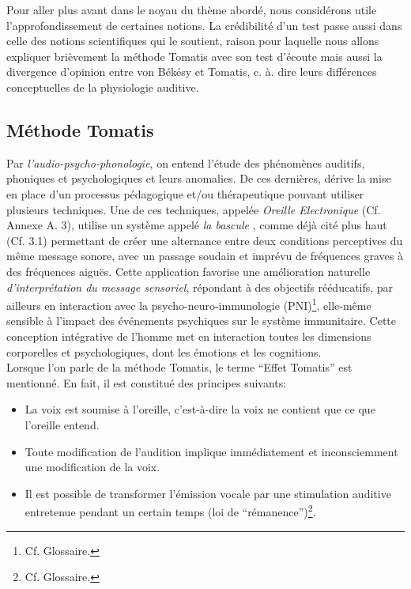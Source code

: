 

Pour aller plus avant dans le noyau du thème abordé, nous considérons utile
l'approfondissement de certaines notions. La crédibilité d'un test passe aussi dans celle des 
notions scientifiques qui le soutient, raison pour laquelle nous allons expliquer brièvement  la 
méthode Tomatis avec son test d'écoute mais aussi la
divergence d'opinion entre von Békésy et Tomatis, c. à. dire leurs différences conceptuelles de la 
physiologie auditive. 
\subsection{Méthode Tomatis}
Par {\textit{l'audio-psycho-phonologie}}, on entend l'étude des
phénomènes auditifs, phoniques et psychologiques et leurs anomalies.
De ces dernières,  dérive la mise en place d'un processus pédagogique
et/ou thérapeutique pouvant
utiliser plusieurs techniques.
Une de ces techniques,
  appelée
\label{outil_oreille_electro}
\textit{Oreille Electronique} (Cf. Annexe A. 3), utilise
un système appelé \textit{ la
bascule} \autocite{escera-key}, comme déjà cité plus haut (Cf. 3.1) permettant de créer une alternance 
entre deux conditions perceptives
du même message sonore, avec un passage soudain et imprévu de fréquences graves à des
fréquences aiguës.
Cette application favorise une amélioration naturelle \emph{d'interprétation du message
sensoriel}, répondant à des objectifs rééducatifs, par ailleurs en
interaction avec la psycho-neuro-immunologie (\gls{PNI})\footnote{Cf. Glossaire.}, elle-même sensible à
l'impact des événements psychiques sur le système immunitaire.
Cette conception intégrative de l'homme met en interaction toutes les
dimensions corporelles et psychologiques, dont les émotions et les cognitions.
\\
Lorsque l'on parle de la méthode Tomatis, le terme ``Effet Tomatis'' \autocite{tomatis_conf1972} est 
mentionné.
En fait, il est constitué des principes suivants:
\begin{itemize}
	\item La voix est soumise à l'oreille, c'est-à-dire la voix ne contient que ce que l'oreille entend.
	\item Toute modification de l'audition implique immédiatement
          et inconsciemment une
          modification de la voix.
	\item Il est possible de transformer l'émission vocale par une stimulation
auditive
		entretenue pendant un certain temps (loi de
               ``\gls{rémanence}'')\footnote{Cf. Glossaire.}.
\end{itemize}
